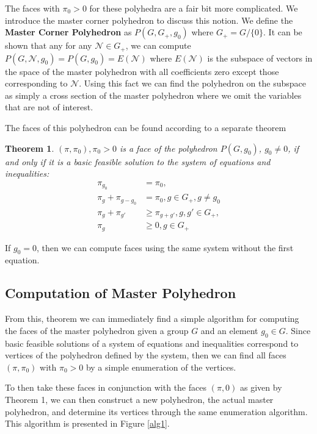 \documentclass{article}
\newtheorem{theorem}{Theorem}
\begin{document}
	The faces with $\pi_0 > 0$ for these polyhedra are a fair bit more complicated. We introduce the master corner polyhedron to discuss this notion. We define the \textbf{Master Corner Polyhedron} as $P(G, G_+, g_0)$ where $G_+ = G/\{0\}$. It can be shown that any for any $\mathcal{N} \in G_+$, we can compute $P(G, \mathcal{N}, g_0) = P(G, g_0) = E(\mathcal{N})$ where $E(\mathcal{N})$ is the subspace of vectors in the space of the master polyhedron with all coefficients zero except those corresponding to $\mathcal{N}$. Using this fact we can find the polyhedron on the subspace as simply a cross section of the master polyhedron where we omit the variables that are not of interest.
	
	The faces of this polyhedron can be found according to a separate theorem
	\begin{theorem}
		$(\pi, \pi_0), \pi_0 > 0$ is a face of the polyhedron $P(G, g_0)$, $g_0 \ne 0$, if and only if it is a basic feasible solution to the system of equations and inequalities:
		\begin{align}
			\pi_{g_0} &= \pi_0, \\
			\pi_g + \pi_{g - g_0} &= \pi_0, g \in G_+, g \ne g_0 \label{equality} \\
			\pi_g + \pi_{g'} &\ge \pi_{g + g'}, g, g' \in G_+, \\
			\pi_g &\ge 0, g \in G_+
		\end{align}
	\end{theorem}
	If $g_0 = 0$, then we can compute faces using the same system without the first equation.
	
	\subsection{Computation of Master Polyhedron}
	From this, theorem we can immediately find a simple algorithm for computing the faces
	of the master polyhedron given a group $G$ and an element $g_0 \in G$. Since basic feasible solutions of a system of equations and inequalities correspond to vertices of the polyhedron defined by the system, then we can find all faces $(\pi, \pi_0)$ with $\pi_0 > 0$ by a simple enumeration of the vertices.
	
	To then take these faces in conjunction with the faces $(\pi, 0)$ as given by Theorem 1, we can then construct a new polyhedron, the actual master polyhedron, and determine its vertices through the same enumeration algorithm. This algorithm is presented in Figure \ref{alg1}. 
	
\end{document}
